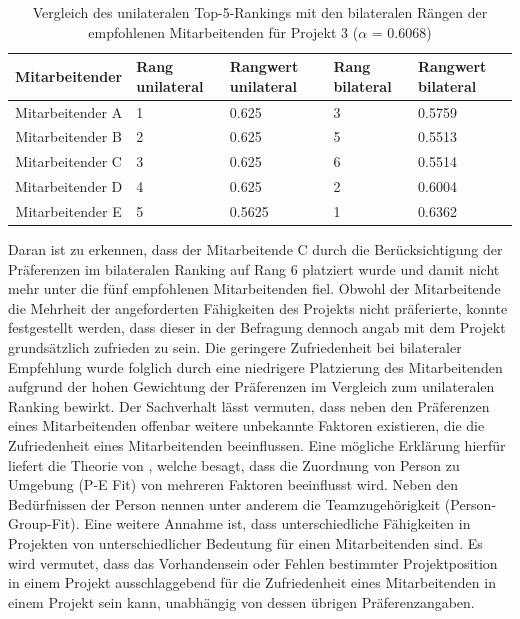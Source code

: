 \begin{table}[htbp]
    \begin{center}
    \begin{tabular}{c|p{0.7in}|p{0.7in}|p{0.7in}|p{0.7in}}
    {\textbf{Mitarbeitender}} & {\textbf{Rang unilateral}} & {\textbf{Rangwert unilateral}} & {\textbf{Rang bilateral}} & {\textbf{Rangwert bilateral}} \\
    \hline
	Mitarbeitender A & \hfil1 & \hfil0.625 & \hfil3 & \hfil0.5759 \\
    \hline
    Mitarbeitender B & \hfil2 & \hfil0.625 & \hfil5 & \hfil0.5513 \\
    \hline
	Mitarbeitender C & \hfil3 & \hfil0.625 & \hfil6 & \hfil0.5514 \\
    \hline
	Mitarbeitender D & \hfil4 & \hfil0.625 & \hfil2 & \hfil0.6004 \\
    \hline
	Mitarbeitender E & \hfil5 & \hfil0.5625 & \hfil1 & \hfil0.6362 \\
    \end{tabular}
    \end{center}
    \caption[Vergleich des unilateralen Top-5-Rankings mit den bilateralen Rängen der empfohlenen Mitarbeitenden für Projekt 3 ($\alpha$ = 0.6068)]{Vergleich des unilateralen Top-5-Rankings mit den bilateralen Rängen der empfohlenen Mitarbeitenden für Projekt 3 ($\alpha$ = 0.6068)}
	\label{tab:diskussion:tab1}
\end{table}

Daran ist zu erkennen, dass der Mitarbeitende C durch die Berücksichtigung der Präferenzen im bilateralen Ranking auf Rang 6 platziert wurde und damit nicht mehr unter die fünf empfohlenen Mitarbeitenden fiel.
Obwohl der Mitarbeitende die Mehrheit der angeforderten Fähigkeiten des Projekts nicht präferierte, konnte festgestellt werden, dass dieser in der Befragung dennoch angab mit dem Projekt grundsätzlich zufrieden zu sein.
Die geringere Zufriedenheit bei bilateraler Empfehlung wurde folglich durch eine niedrigere Platzierung des Mitarbeitenden aufgrund der hohen Gewichtung der Präferenzen im Vergleich zum unilateralen Ranking bewirkt.
Der Sachverhalt lässt vermuten, dass neben den Präferenzen eines Mitarbeitenden offenbar weitere unbekannte Faktoren existieren, die die Zufriedenheit eines Mitarbeitenden beeinflussen.
Eine mögliche Erklärung hierfür liefert die Theorie von \textcite[S. 1ff.]{malinowski:2006}, welche besagt, dass die Zuordnung von Person zu Umgebung (\ac{P-E Fit}) von mehreren Faktoren beeinflusst wird.
Neben den Bedürfnissen der Person nennen \textcite[S. 1ff.]{malinowski:2006} unter anderem die Teamzugehörigkeit (Person-Group-Fit).
Eine weitere Annahme ist, dass unterschiedliche Fähigkeiten in Projekten von unterschiedlicher Bedeutung für einen Mitarbeitenden sind.
Es wird vermutet, dass das Vorhandensein oder Fehlen bestimmter Projektposition in einem Projekt ausschlaggebend für die Zufriedenheit eines Mitarbeitenden in einem Projekt sein kann, unabhängig von dessen übrigen Präferenzangaben.

